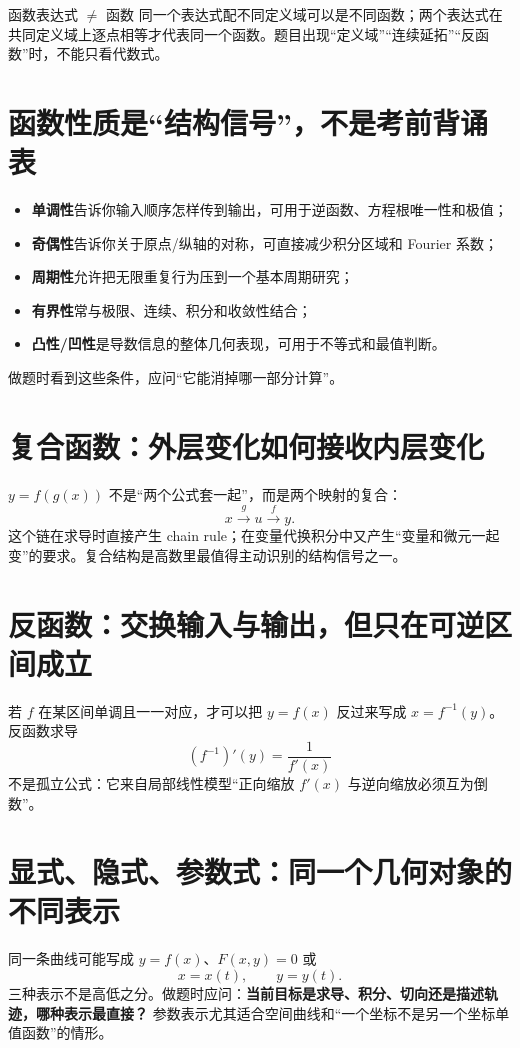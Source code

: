 \documentclass[11pt,a4paper,openany]{ctexbook}
\newcommand{\key}[1]{\textbf{\color{deep}#1}}
\begin{document}
\begin{boundarybox}{函数表达式 $\neq$ 函数}
同一个表达式配不同定义域可以是不同函数；两个表达式在共同定义域上逐点相等才代表同一个函数。题目出现“定义域”“连续延拓”“反函数”时，不能只看代数式。
\end{boundarybox}

\section{函数性质是“结构信号”，不是考前背诵表}
\begin{itemize}
  \item \key{单调性}告诉你输入顺序怎样传到输出，可用于逆函数、方程根唯一性和极值；
  \item \key{奇偶性}告诉你关于原点/纵轴的对称，可直接减少积分区域和 Fourier 系数；
  \item \key{周期性}允许把无限重复行为压到一个基本周期研究；
  \item \key{有界性}常与极限、连续、积分和收敛性结合；
  \item \key{凸性/凹性}是导数信息的整体几何表现，可用于不等式和最值判断。
\end{itemize}
做题时看到这些条件，应问“它能消掉哪一部分计算”。

\section{复合函数：外层变化如何接收内层变化}
$y=f(g(x))$ 不是“两个公式套一起”，而是两个映射的复合：
\[
x\xrightarrow{g}u\xrightarrow{f}y.
\]
这个链在求导时直接产生 chain rule；在变量代换积分中又产生“变量和微元一起变”的要求。复合结构是高数里最值得主动识别的结构信号之一。

\section{反函数：交换输入与输出，但只在可逆区间成立}
若 $f$ 在某区间单调且一一对应，才可以把 $y=f(x)$ 反过来写成 $x=f^{-1}(y)$。反函数求导
\[
(f^{-1})'(y)=\frac{1}{f'(x)}
\]
不是孤立公式：它来自局部线性模型“正向缩放 $f'(x)$ 与逆向缩放必须互为倒数”。

\section{显式、隐式、参数式：同一个几何对象的不同表示}
同一条曲线可能写成 $y=f(x)$、$F(x,y)=0$ 或
\[
x=x(t),\qquad y=y(t).
\]
三种表示不是高低之分。做题时应问：\key{当前目标是求导、积分、切向还是描述轨迹，哪种表示最直接？}
参数表示尤其适合空间曲线和“一个坐标不是另一个坐标单值函数”的情形。
\end{document}
